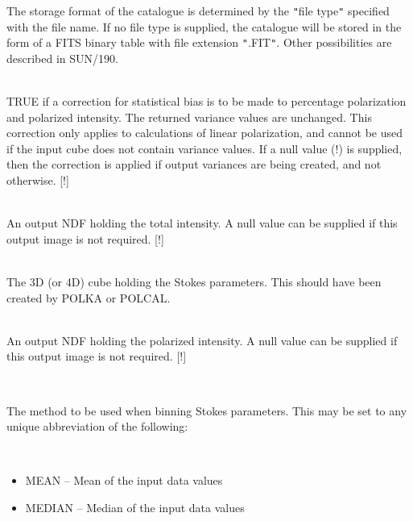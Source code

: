 \documentclass[twoside,11pt]{article}
\renewcommand{\_}{\texttt{\symbol{95}}}
\newcommand{\sstsubsection}[1]{ \item[{#1}] \mbox{} \\}
\newcommand{\sstitemlist}[1]{
  \mbox{} \\
  \vspace{-3.5ex}
  \begin{itemize}
     #1
  \end{itemize}
}
\newcommand{\sstitem}{\item}
\newcommand{\sstsubsection}[1]{\item[{#1}]}
\newcommand{\sstitemlist}[1]{
      \begin{itemize}
         #1
      \end{itemize}
      \\
   }
\newcommand{\sstitem}{\item}
\begin{document}
{{{         The storage format of the catalogue is determined by the {\tt "}file
         type{\tt "} specified with the file name. If no file type is supplied,
         the catalogue will be stored in the form of a FITS binary table
         with file extension {\tt "}.FIT{\tt "}. Other possibilities are described in
         SUN/190.
      }
      \sstsubsection{
         DEBIAS = \_LOGICAL (Read)
      }{
         TRUE if a correction for statistical bias is to be made to
         percentage polarization and polarized intensity. The returned
         variance values are unchanged. This correction only applies to
         calculations of linear polarization, and cannot be used if the
         input cube does not contain variance values. If a null value
         (!) is supplied, then the correction is applied if output variances
         are being created, and not otherwise.           [!]
      }
      \sstsubsection{
         I = NDF (Write)
      }{
         An output NDF holding the total intensity. A null value can be
         supplied if this output image is not required. [!]
      }
      \sstsubsection{
         IN = NDF (Read)
      }{
         The 3D (or 4D) cube holding the Stokes parameters. This should have
         been created by POLKA or POLCAL.
      }
      \sstsubsection{
         IP = NDF (Write)
      }{
         An output NDF holding the polarized intensity. A null value can be
         supplied if this output image is not required. [!]
      }
      \sstsubsection{
         METHOD = LITERAL (Read)
      }{
         The method to be used when binning Stokes parameters. This may be
         set to any unique abbreviation of the following:
         \sstitemlist{

            \sstitem
               MEAN      -- Mean of the input data values

            \sstitem
               MEDIAN    -- Median of the input data values

}}}}
\end{document}
